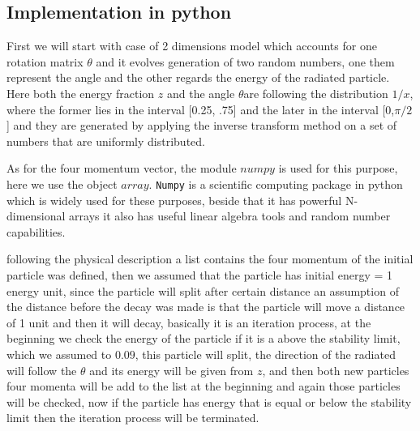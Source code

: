 \subsection{Implementation in python}
First we will start with case of 2 dimensions model which accounts for one rotation matrix $\theta$ and it evolves generation of two random numbers, one them represent the angle and the other regards the energy of the radiated particle. Here both the energy fraction $z$ and the angle $\theta$are following the distribution $1/x$, where the former lies in the interval [0.25, .75]
and the later in the interval [0,$\pi/2$] and they are generated by applying the inverse transform method on a set of numbers that are uniformly distributed.

As for the four momentum vector, the module $numpy$ is used for this purpose, here we use the object $array$. \verb+Numpy+ is a scientific computing package in python which is widely used for these purposes, beside that it has powerful N-dimensional arrays it also has useful linear algebra tools and random number capabilities.         

following the physical description a list contains the four momentum of the initial particle was defined, then we assumed that the particle has initial energy = 1 energy unit, since the particle will split after certain distance an assumption of the distance before the decay was made is that the particle will move a distance of 1 unit and then it will decay, basically it is an iteration process,  at the beginning we check the energy of the particle if it is a above the stability limit, which we assumed to $0.09$, this particle will split, the direction of the radiated will follow the $\theta$ and its energy will be given from $z$, and then both new particles four momenta will be add to the list at the beginning and again those particles will be checked, now if the particle has energy that is equal or below the stability limit then the iteration process will be terminated.   

